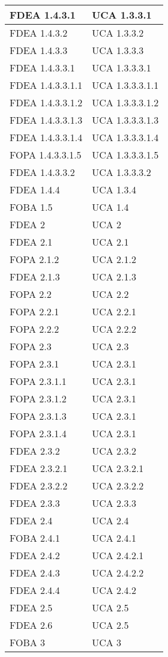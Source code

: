 \begin{longtable}{XX}
\midrule
FDEA 1.4.3.1&UCA 1.3.3.1\\
\midrule
FDEA 1.4.3.2&UCA 1.3.3.2\\
\midrule
FDEA 1.4.3.3&UCA 1.3.3.3\\
\midrule
FDEA 1.4.3.3.1&UCA 1.3.3.3.1\\
\midrule
FDEA 1.4.3.3.1.1&UCA 1.3.3.3.1.1\\
\midrule
FDEA 1.4.3.3.1.2&UCA 1.3.3.3.1.2\\
\midrule
FDEA 1.4.3.3.1.3&UCA 1.3.3.3.1.3\\
\midrule
FDEA 1.4.3.3.1.4&UCA 1.3.3.3.1.4\\
\midrule
FOPA 1.4.3.3.1.5&UCA 1.3.3.3.1.5\\
\midrule
FDEA 1.4.3.3.2&UCA 1.3.3.3.2\\
\midrule
FDEA 1.4.4&UCA 1.3.4\\
\midrule
FOBA 1.5&UCA 1.4\\
\midrule
FDEA 2&UCA 2\\
\midrule
FDEA 2.1&UCA 2.1\\
\midrule
FOPA 2.1.2&UCA 2.1.2\\
\midrule
FDEA 2.1.3&UCA 2.1.3\\
\midrule
FOPA 2.2&UCA 2.2\\
\midrule
FOPA 2.2.1&UCA 2.2.1\\
\midrule
FOPA 2.2.2&UCA 2.2.2\\
\midrule
FOPA 2.3&UCA 2.3\\
\midrule
FOPA 2.3.1&UCA 2.3.1\\
\midrule
FOPA 2.3.1.1&UCA 2.3.1\\
\midrule
FOPA 2.3.1.2&UCA 2.3.1\\
\midrule
FOPA 2.3.1.3&UCA 2.3.1\\
\midrule
FOPA 2.3.1.4&UCA 2.3.1\\
\midrule
FDEA 2.3.2&UCA 2.3.2\\
\midrule
FDEA 2.3.2.1&UCA 2.3.2.1\\
\midrule
FDEA 2.3.2.2&UCA 2.3.2.2\\
\midrule
FDEA 2.3.3&UCA 2.3.3\\
\midrule
FDEA 2.4&UCA 2.4\\
\midrule
FOBA 2.4.1&UCA 2.4.1\\
\midrule
FDEA 2.4.2&UCA 2.4.2.1\\
\midrule
FDEA 2.4.3&UCA 2.4.2.2\\
\midrule
FDEA 2.4.4&UCA 2.4.2\\
\midrule
FDEA 2.5&UCA 2.5\\
\midrule
FDEA 2.6&UCA 2.5\\
\midrule
FOBA 3&UCA 3\\
\midrule


\end{longtable}
